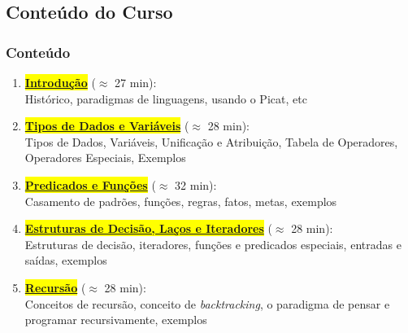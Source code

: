 \subsection{Conteúdo do Curso}
			
\begin{frame}[fragile]
  \frametitle{Conteúdo}
  \begin{enumerate}

    \item  \colorbox{yellow}{\textbf{\underline{Introdução}}} ($\approx$ 27 min):\\
    Histórico, paradigmas de linguagens, usando o Picat, etc

    \pause
    \item \colorbox{yellow}{\textbf{\underline{Tipos de Dados e Variáveis}}} ($\approx$ 28 min):\\
Tipos de Dados, Variáveis, Unificação e Atribuição, Tabela de Operadores, Operadores Especiais,
 Exemplos
    
    \pause
		\item \colorbox{yellow}{\textbf{\underline{Predicados e Funções}}} ($\approx$ 32 min):\\
Casamento de padrões, funções, regras, fatos, metas, exemplos
		
    \pause
    \item \colorbox{yellow}{\textbf{\underline{Estruturas de Decisão, Laços e Iteradores}}} ($\approx$ 28 min):\\
Estruturas de decisão, iteradores, funções e predicados especiais, 
entradas e saídas, exemplos
    
    \pause
		\item  \colorbox{yellow}{\textbf{\underline{Recursão}}} ($\approx$ 28 min):\\
     Conceitos de recursão, conceito de \textit{backtracking}, o paradigma
     de pensar e programar recursivamente, exemplos
\end{enumerate}

\end{frame}





